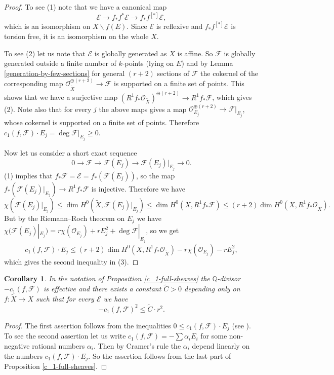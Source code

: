 \documentclass[twoside, 11pt]{article}
\theoremstyle{plain}
\newtheorem{Corollary}[Thm]{\sc Corollary}
\theoremstyle{definition}
\theoremstyle{remark}
\newcommand{\QQ}{{\mathbb Q}}
\newcommand{\cE}{{\mathcal E}}
\newcommand{\cF}{{\mathcal F}}
\newcommand{\cO}{{\mathcal O}}
\begin{document}
\begin{proof}
To see (1) note that we have a canonical map
$$\cE\to f_*f^*\cE\to f_*f^{[*]}\cE,$$
which is an isomorphism on $X\backslash f(E)$. Since $\cE$ is reflexive and $f_*f^{[*]}\cE$ is torsion free, 
it is an isomorphism on the whole $X$.

To see (2) let us note that $\cE$ is globally generated as $X$ is affine. So $\cF$ is globally generated outside a finite number of $k$-points (lying on $E$) and by Lemma \ref{generation-by-few-sections}
for general $(r+2)$ sections of $\cF$ the cokernel of the corresponding map
$\cO ^{\oplus (r+2)}_{\tilde X}\to \cF$ is supported on a finite set of points.
This shows that we have a surjective map $(R^1f_*\cO_{\tilde X} )^{\oplus (r+2)}\to R^1f_*\cF$, which gives (2).
Note also that for every $j$ the above maps gives a map $\cO ^{\oplus (r+2)}_{E_j}\to \cF|_{E_j}$, whose cokernel is supported on a finite set of points. Therefore $c_1(f, \cF)\cdot E_j=\deg \cF|_{E_j} \ge 0$.

Now let us consider a short exact sequence 
$$0\to \cF\to \cF(E_j)\to \cF(E_j)|_{E_j}\to 0.$$
(1) implies that $f_* \cF=\cE=f_*(\cF(E_j))$, so the map $ f_*(\cF(E_j)|_{E_j})\to R^1f_*\cF$ is injective.
Therefore we have
$$ \chi ( \cF(E_j)|_{E_j})\le \dim H^0(\tilde X, \cF(E_j)|_{E_j})\le \dim  H^0(X, R^1 f_*\cF)\le (r+2)\dim  H^0(X, R^1 f_*\cO _{\tilde X}).$$
But by the Riemann--Roch theorem on $E_j$ we have
$ \chi ( \cF(E_j)|_{E_j})= r\chi (\cO_{E_j} ) +r E_j^2+ \deg \cF|_{E_j}$, so we get
$$c_1(f, \cF)\cdot E_j \le (r+2)\dim  H^0(X, R^1 f_*\cO _{\tilde X}) - r\chi (\cO_{E_j} ) -r E_j^2,$$
which gives the second inequality in (3).
\end{proof}

\medskip


\medskip

\begin{Corollary}\label{corr-c_1-full-sheaves}
	In the notation of Proposition \ref{c_1-full-sheaves} the $\QQ$-divisor $-c_1(f, \cF)$ is effective and there exists a constant $\tilde C>0$ depending only on $f: \tilde X\to X$ such that for every $\cE$ we have
	$$-c_1(f, \cF)^2\le \tilde C\cdot r^2.$$
\end{Corollary}

\begin{proof}
	The first assertion follows from the inequalities $0\le c_1(f, \cF)\cdot E_j$ (see \cite[(7)]{Gi}). To see the second assertion let us write  $c_1(f, \cF)=-\sum \alpha_i E_i$ for some non-negative rational numbers $\alpha_i$. Then by Cramer's rule the $\alpha_i$ depend linearly on the numbers $c_1(f, \cF)\cdot E_j$. So the assertion follows from the last part of Proposition \ref{c_1-full-sheaves}.
\end{proof}
\end{document}
